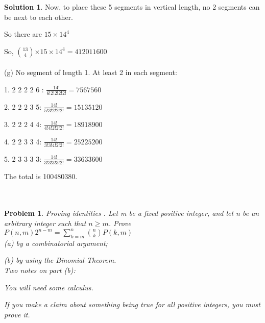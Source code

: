 \documentclass{article}
\newtheorem{problem}{Problem}
\theoremstyle{definition}
\newtheorem*{solution}{Solution}
\begin{document}
\begin{solution}
Now, to place these 5 segments in vertical length, no 2 segments can be next to each other.

So there are \(15\times14^{4}\)

So, \(13\choose4\)\(\times\)\(15\times14^{4}\)\(=412011600\)\\\\


(g) No segment of length 1. At least 2 in each segment:

1. 2 2 2 2 6 : \(\frac{14!}{6!2!2!2!2!} = 7567560\)

2. 2 2 2 3 5: \(\frac{14!}{5!3!2!2!2!} = 15135120\)

3. 2 2 2 4 4: \(\frac{14!}{4!4!2!2!2!} = 18918900\)

4. 2 2 3 3 4: \(\frac{14!}{3!3!4!2!2!} = 25225200\)

5. 2 3 3 3 3:  \(\frac{14!}{3!3!3!3!2!} = 33633600\)

The total is 100480380.\\\\\\

\end{solution}





\begin{problem}
Proving identities . Let m be a fixed positive integer, and let n be an arbitrary integer such that \(n \geq m\). Prove\\

\(P(n,m)2^{n-m} = \sum_{k=m}^{n}{{n}\choose{k}}P(k,m)\)\\

(a) by a combinatorial argument;

(b) by using the Binomial Theorem.\\

Two notes on part (b):

You will need some calculus.

If you make a claim about something being true for all positive integers, you must prove it.



\end{problem}
\end{document}
